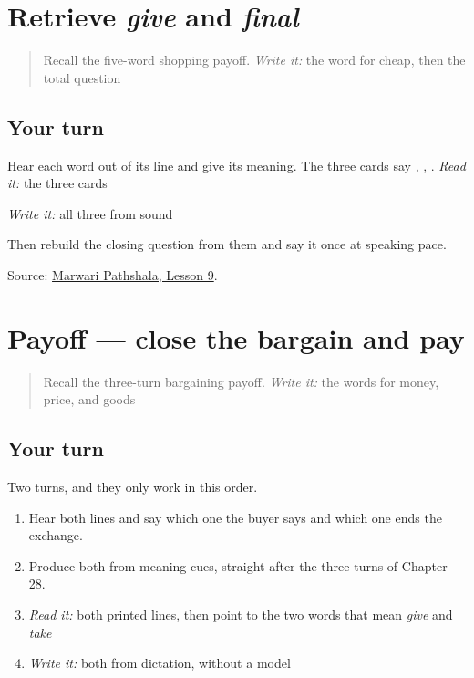 \section[Practice]{Retrieve \emph{give} and \emph{final}}

\label{lesson:MW-R24-final-two}



\begin{quote}
Recall the five-word shopping payoff. \emph{Write it:} the word for cheap, then the total question
\end{quote}

\subsection*{Your turn}
Hear each word out of its line and give its meaning. The three cards say \textbf{}, \textbf{}, \textbf{}. \emph{Read it:} the three cards

\emph{Write it:} all three from sound

Then rebuild the closing question from them and say it once at speaking pace.

\begin{tcolorbox}[breakable,colback=teal!4,colframe=teal!35!black,title={Before you move on}]
Source: \href{https://www.marwaripathshala.com/marwari-lesson-9-english}{Marwari Pathshala, Lesson 9}.
\end{tcolorbox}
\section[Practice]{Payoff — close the bargain and pay}

\label{lesson:MW-C24-final-four}



\begin{quote}
Recall the three-turn bargaining payoff. \emph{Write it:} the words for money, price, and goods
\end{quote}

\subsection*{Your turn}
Two turns, and they only work in this order.

\begin{enumerate}
\raggedright
  \item Hear both lines and say which one the buyer says and which one ends the exchange.
  \item Produce both from meaning cues, straight after the three turns of Chapter 28.
  \item \emph{Read it:} both printed lines, then point to the two words that mean \emph{give} and \emph{take}
  \item \emph{Write it:} both from dictation, without a model
\end{enumerate}

